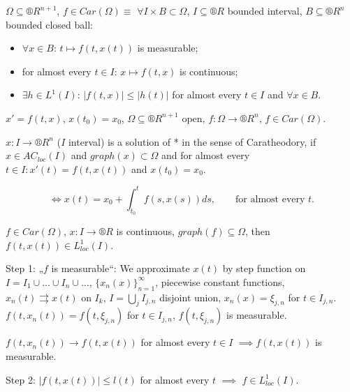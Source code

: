 \documentclass[12pt]{article}					%
\begin{document}
\begin{definice}
	$\Omega \subseteq ®R^{n+1}$, $f \in Car(\Omega) ≡$ $\forall I \times B \subset \Omega$, $I \subseteq ®R$ bounded interval, $B \subseteq ®R^n$ bounded closed ball:
	\begin{itemize}
		\item $\forall x \in B$: $t \mapsto f(t, x(t))$ is measurable;
		\item for almost every $t \in I$: $x \mapsto f(t, x)$ is continuous;
		\item $\exists h \in L^1(I)$: $|f(t, x)| ≤ |h(t)|$ for almost every $t \in I$ and $\forall x \in B$.
	\end{itemize}
\end{definice}


\begin{definice}[*]
	$x' = f(t, x)$, $x(t_0) = x_0$, $\Omega \subseteq ®R^{n+1}$ open, $f: \Omega \rightarrow ®R^n$, $f \in Car(\Omega)$.
\end{definice}

\begin{definice}
	$x: I \rightarrow ®R^n$ ($I$ interval) is a solution of * in the sense of Caratheodory, if $x \in AC_{loc}(I)$ and $graph(x) \subset \Omega$ and for almost every $t \in I: x'(t) = f(t, x(t))$ and $x(t_0) = x_0$.

	\begin{poznamka}
		$$ \Leftrightarrow x(t) = x_0 + \int_{t_0}^t f(s, x(s)) ds, \qquad \text{for almost every } t. $$
	\end{poznamka}
\end{definice}

\begin{lemma}
	$f \in Car(\Omega)$, $x: I \rightarrow ®R$ is continuous, $graph(f) \subseteq \Omega$, then $f(t, x(t)) \in L_{loc}^1(I)$.

	\begin{dukazin}
		Step 1: „$f$ is measurable“: We approximate $x(t)$ by step function on $I = I_1 \cup … \cup I_n \cup …$, $\{x_n(x)\}_{n=1}^∞$, piecewise constant functions, $x_n(t) \rightrightarrows x(t)$ on $I_k$, $I = \bigcup_j I_{j, n}$ disjoint union, $x_n(x) = \xi_{j, n}$ for $t \in I_{j, n}$. $f(t, x_n(t)) = f(t, \xi_{j, n})$ for $t \in I_{j, n}$, $f(t, \xi_{j, n})$ is measurable.

		$f(t, x_n(t)) \rightarrow f(t, x(t))$ for almost every $t \in I$ $\implies f(t, x(t))$ is measurable.

		Step 2: $|f(t, x(t))| ≤ l(t)$ for almost every $t$ $\implies$ $f \in L_{loc}^1(I)$.
	\end{dukazin}
\end{lemma}
\end{document}
